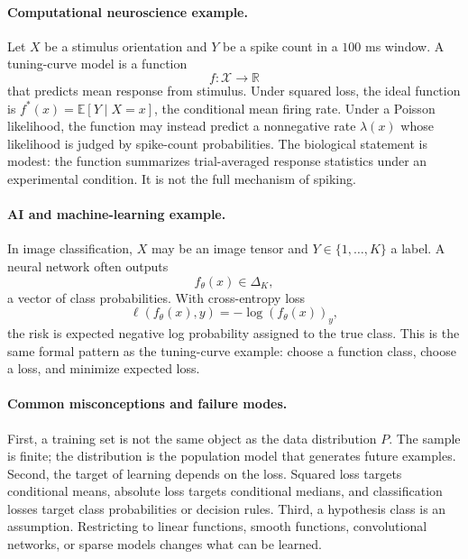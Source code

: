 \paragraph{Computational neuroscience example.}
Let \(X\) be a stimulus orientation and \(Y\) be a spike count in a \(100\) ms window. A tuning-curve model is a function
\[
f:\mathcal X\to\mathbb R
\]
that predicts mean response from stimulus. Under squared loss, the ideal function is \(f^*(x)=\mathbb E[Y\mid X=x]\), the conditional mean firing rate. Under a Poisson likelihood, the function may instead predict a nonnegative rate \(\lambda(x)\) whose likelihood is judged by spike-count probabilities. The biological statement is modest: the function summarizes trial-averaged response statistics under an experimental condition. It is not the full mechanism of spiking.

\paragraph{AI and machine-learning example.}
In image classification, \(X\) may be an image tensor and \(Y\in\{1,\ldots,K\}\) a label. A neural network often outputs
\[
f_\theta(x)\in\Delta_K,
\]
a vector of class probabilities. With cross-entropy loss
\[
\ell(f_\theta(x),y)=-\log (f_\theta(x))_y,
\]
the risk is expected negative log probability assigned to the true class. This is the same formal pattern as the tuning-curve example: choose a function class, choose a loss, and minimize expected loss.

\paragraph{Common misconceptions and failure modes.}
First, a training set is not the same object as the data distribution \(P\). The sample is finite; the distribution is the population model that generates future examples. Second, the target of learning depends on the loss. Squared loss targets conditional means, absolute loss targets conditional medians, and classification losses target class probabilities or decision rules. Third, a hypothesis class is an assumption. Restricting to linear functions, smooth functions, convolutional networks, or sparse models changes what can be learned.

